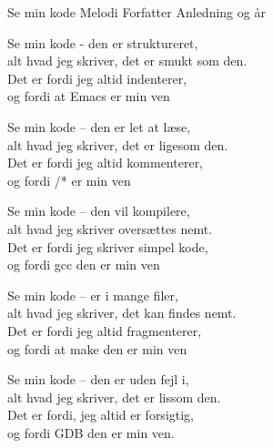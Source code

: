 \begin{song}{Se min kode}
  {} %
  {Melodi} %
  {Forfatter} %
  {Anledning og år} %
  {\NotCCLIed} %

  \begin{SBVerse}
    Se min kode - den er struktureret,\\
    alt hvad jeg skriver, det er smukt som den.\\
    Det er fordi jeg altid indenterer,\\
    og fordi at Emacs er min ven
  \end{SBVerse}

  \begin{SBVerse}
    Se min kode – den er let at læse,\\
    alt hvad jeg skriver, det er ligesom den.\\
    Det er fordi jeg altid kommenterer,\\
    og fordi /* er min ven
  \end{SBVerse}

  \begin{SBVerse}
    Se min kode – den vil kompilere,\\
    alt hvad jeg skriver oversættes nemt.\\
    Det er fordi jeg skriver simpel kode,\\
    og fordi gcc den er min ven
  \end{SBVerse}

  \begin{SBVerse}
    Se min kode – er i mange filer,\\
    alt hvad jeg skriver, det kan findes nemt.\\
    Det er fordi jeg altid fragmenterer,\\
    og fordi at make den er min ven
  \end{SBVerse}

  \begin{SBVerse}
    Se min kode – den er uden fejl i,\\
    alt hvad jeg skriver, det er lissom den.\\
    Det er fordi, jeg altid er forsigtig,\\
    og fordi GDB den er min ven.
  \end{SBVerse}


\end{song}
